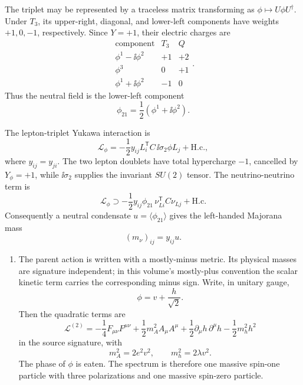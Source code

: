 \begin{enumerate}
  The triplet may be represented by a traceless matrix transforming as
  \(\phi\mapsto U\phi U^\dagger\).  Under \(T_3\), its upper-right,
  diagonal, and lower-left components have weights \(+1,0,-1\),
  respectively.  Since \(Y=+1\), their electric charges are
  \[
    \begin{array}{c|c|c}
      \text{component}&T_3&Q\\ \hline
      \phi^1-\ii\phi^2&+1&+2\\
      \phi^3&0&+1\\
      \phi^1+\ii\phi^2&-1&0
    \end{array}.
  \]
  Thus the neutral field is the lower-left component
  \[
    \phi_{21}=\frac12(\phi^1+\ii\phi^2).
  \]

  The lepton-triplet Yukawa interaction is
  \[
    \boxed{\mathcal L_\phi
      =-\frac12y_{ij}L_i^{\mathsf T}C\,\ii\sigma_2\phi L_j
        +\mathrm{H.c.},}
  \]
  where \(y_{ij}=y_{ji}\).  The two lepton doublets have total
  hypercharge \(-1\), cancelled by \(Y_\phi=+1\), while
  \(\ii\sigma_2\) supplies the invariant \(SU(2)\) tensor.  The
  neutrino-neutrino term is
  \[
    \mathcal L_\phi\supset
      -\frac12y_{ij}\phi_{21}\,
        \nu_{Li}^{\mathsf T}C\nu_{Lj}+\mathrm{H.c.}
  \]
  Consequently a neutral condensate
  \(u=\langle\phi_{21}\rangle\) gives the left-handed Majorana mass
  \[
    \boxed{(m_\nu)_{ij}=y_{ij}u.}
  \]

  \begin{enumerate}
    \item[(i)]
    The parent action is written with a mostly-minus metric.  Its physical
    masses are signature independent; in this volume's mostly-plus
    convention the scalar kinetic term carries the corresponding minus
    sign.  Write, in unitary gauge,
    \[
      \phi=v+\frac{h}{\sqrt2}.
    \]
    Then the quadratic terms are
    \[
      \mathcal L^{(2)}
        =-\frac14F_{\mu\nu}F^{\mu\nu}
         +\frac12m_A^2A_\mu A^\mu
         +\frac12\partial_\mu h\,\partial^\mu h
         -\frac12m_h^2h^2
    \]
    in the source signature, with
    \[
      \boxed{m_A^2=2e^2v^2,\qquad m_h^2=2\lambda v^2.}
    \]
    The phase of \(\phi\) is eaten.  The spectrum is therefore one
    massive spin-one particle with three polarizations and one massive
    spin-zero particle.


\end{enumerate}
\end{enumerate}
